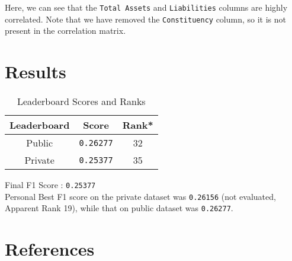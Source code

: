 \documentclass{article}
\begin{document}
Here, we can see that the \texttt{Total Assets} and \texttt{Liabilities} columns are highly correlated.
Note that we have removed the \texttt{Constituency} column, so it is not present in the correlation matrix.

\section{Results}

\begin{table}[H]
    \centering
    \begin{tabular}{|c|c|c|}
        \hline
        Leaderboard & Score            & Rank* \\
        \hline
        Public      & \texttt{0.26277} & 32    \\
        \hline
        Private     & \texttt{0.25377} & 35    \\
        \hline
    \end{tabular}
    \caption{Leaderboard Scores and Ranks}
    \label{tab:leaderboard}
\end{table}

Final F1 Score : \texttt{0.25377}\\
Personal Best F1 score on the private dataset was \texttt{0.26156} (not evaluated, Apparent Rank 19), while that on public dataset was \texttt{0.26277}.

\section{References}

\printbibliography[heading=none]
\end{document}

